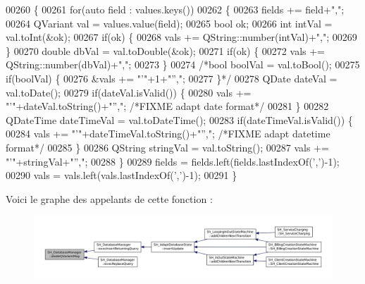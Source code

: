 \begin{DoxyCode}
00260                                                                                              \{
00261     \textcolor{keywordflow}{for}(\textcolor{keyword}{auto} field : values.keys())
00262     \{
00263         fields += field+\textcolor{stringliteral}{","};
00264         QVariant val = values.value(field);
00265         \textcolor{keywordtype}{bool} ok;
00266         \textcolor{keywordtype}{int} intVal = val.toInt(&ok);
00267         \textcolor{keywordflow}{if}(ok) \{
00268             vals += QString::number(intVal)+\textcolor{stringliteral}{","};
00269         \}
00270         \textcolor{keywordtype}{double} dbVal = val.toDouble(&ok);
00271         \textcolor{keywordflow}{if}(ok) \{
00272             vals += QString::number(dbVal)+\textcolor{stringliteral}{","};
00273         \}
00274         \textcolor{comment}{/*bool boolVal = val.toBool();
}
00275 \textcolor{comment}{                if(boolVal) \{
}
00276 \textcolor{comment}{                    &vals += "'"+1+"'',";
}
00277 \textcolor{comment}{                \}*/}
00278         QDate dateVal = val.toDate();
00279         \textcolor{keywordflow}{if}(dateVal.isValid()) \{
00280             vals += \textcolor{stringliteral}{"'"}+dateVal.toString()+\textcolor{stringliteral}{"'',"}; \textcolor{comment}{/*FIXME adapt date format*/}
00281         \}
00282         QDateTime dateTimeVal = val.toDateTime();
00283         \textcolor{keywordflow}{if}(dateTimeVal.isValid()) \{
00284             vals += \textcolor{stringliteral}{"'"}+dateTimeVal.toString()+\textcolor{stringliteral}{"'',"}; \textcolor{comment}{/*FIXME adapt datetime format*/}
00285         \}
00286         QString stringVal = val.toString();
00287         vals += \textcolor{stringliteral}{"'"}+stringVal+\textcolor{stringliteral}{"'',"};
00288     \}
00289     fields = fields.left(fields.lastIndexOf(\textcolor{charliteral}{','})-1);
00290     vals = vals.left(vals.lastIndexOf(\textcolor{charliteral}{','})-1);
00291 \}
\end{DoxyCode}


Voici le graphe des appelants de cette fonction \-:
\nopagebreak
\begin{figure}[H]
\begin{center}
\leavevmode
\includegraphics[width=350pt]{classSH__DatabaseManager_acab8936d9c694610eda1c157a405ead3_icgraph}
\end{center}
\end{figure}


